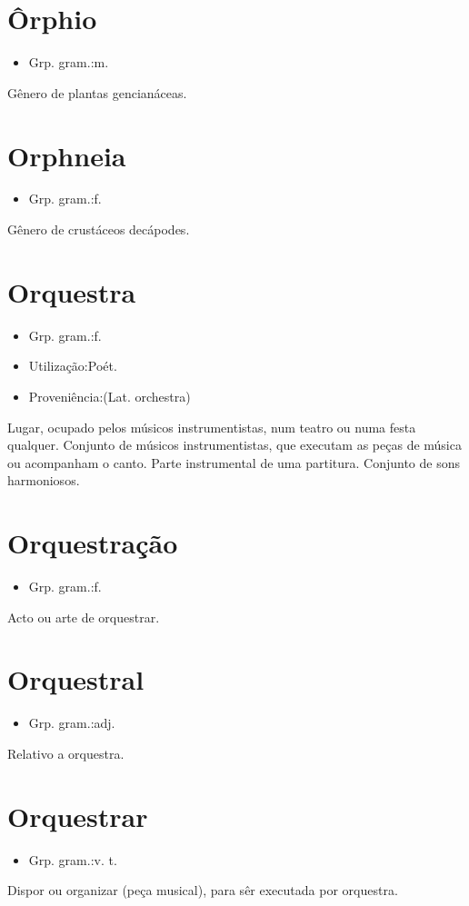\section{Ôrphio}
\begin{itemize}
\item {Grp. gram.:m.}
\end{itemize}
Gênero de plantas gencianáceas.
\section{Orphneia}
\begin{itemize}
\item {Grp. gram.:f.}
\end{itemize}
Gênero de crustáceos decápodes.
\section{Orquestra}
\begin{itemize}
\item {Grp. gram.:f.}
\end{itemize}
\begin{itemize}
\item {Utilização:Poét.}
\end{itemize}
\begin{itemize}
\item {Proveniência:(Lat. \textunderscore orchestra\textunderscore )}
\end{itemize}
Lugar, ocupado pelos músicos instrumentistas, num teatro ou numa festa qualquer.
Conjunto de músicos instrumentistas, que executam as peças de música ou acompanham o canto.
Parte instrumental de uma partitura.
Conjunto de sons harmoniosos.
\section{Orquestração}
\begin{itemize}
\item {Grp. gram.:f.}
\end{itemize}
Acto ou arte de orquestrar.
\section{Orquestral}
\begin{itemize}
\item {Grp. gram.:adj.}
\end{itemize}
Relativo a orquestra.
\section{Orquestrar}
\begin{itemize}
\item {Grp. gram.:v. t.}
\end{itemize}
Dispor ou organizar (peça musical), para sêr executada por orquestra.
